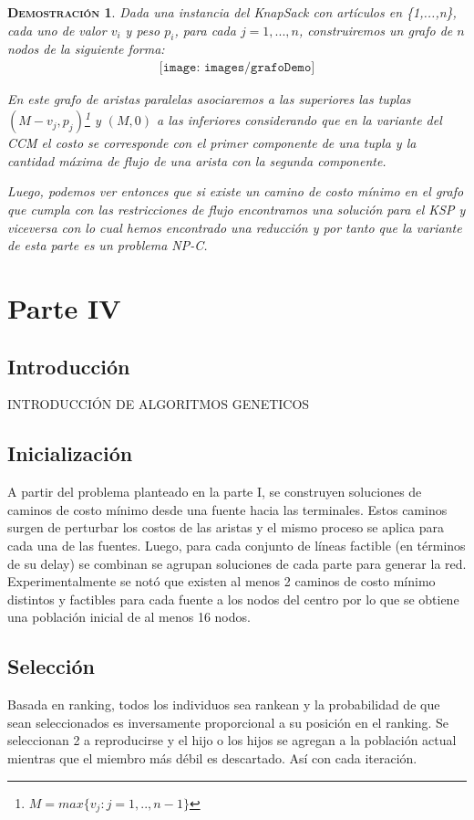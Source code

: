 \documentclass[a4paper,11pt]{article}
\newtheorem{demo}{\scshape{Demostración}}
\theoremstyle{break}
\begin{document}
\begin{demo}
	Dada una instancia del KnapSack con artículos en \{1,...,n\}, cada uno de valor $v_{i}$ y peso $p_{i}$, para cada $j=1,...,n$, construiremos un grafo de $n$ nodos de la siguiente forma:
	\begin{align*}
	\texttt{[image: images/grafoDemo]}
	\end{align*}
	
	En este grafo de aristas paralelas asociaremos a las superiores las tuplas $(M-v_{j},p_{j})$\footnote{$M = max\{v_{j}: j=1,..,n-1\}$} y $(M,0)$ a las inferiores considerando que en la variante del CCM el costo se corresponde con el primer componente de una tupla y la cantidad máxima de flujo de una arista con la segunda componente.
	
	Luego, podemos ver entonces que si existe un camino de costo mínimo en el grafo que cumpla con las restricciones de flujo encontramos una solución para el KSP y viceversa con lo cual hemos encontrado una reducción y por tanto que la variante de esta parte es un problema NP-C.
		
\end{demo}	

\section{Parte IV}
\subsection{Introducción}
INTRODUCCIÓN DE ALGORITMOS GENETICOS
\subsection{Inicialización}
A partir del problema planteado en la parte I, se construyen soluciones de caminos de costo mínimo desde una fuente hacia las terminales. Estos caminos surgen de perturbar los costos de las aristas y el mismo proceso se aplica para cada una de las fuentes. Luego, para cada conjunto de líneas factible (en términos de su delay) se combinan se agrupan soluciones de cada parte para generar la red.
Experimentalmente se notó que existen al menos 2 caminos de costo mínimo distintos y factibles para cada fuente a los nodos del centro por lo que se obtiene una población inicial de al menos 16 nodos.
\subsection{Selección}
Basada en ranking, todos los individuos sea rankean y la probabilidad de que sean seleccionados es inversamente proporcional a su posición en el ranking. Se seleccionan 2 a reproducirse y el hijo o los hijos se agregan a la población actual mientras que el miembro más débil es descartado. Así con cada iteración.
\end{document}
